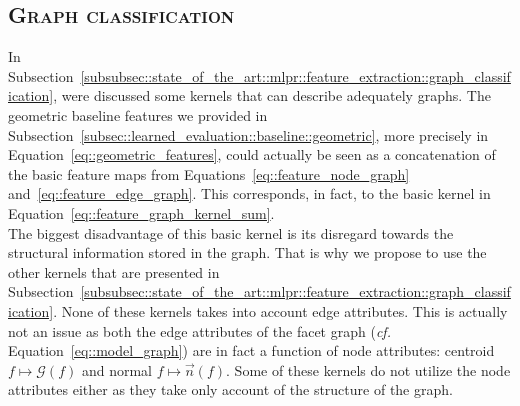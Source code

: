     \subsection{\textsc{Graph classification}}
        \label{subsec::learned_evaluation::richer_features::graph}
        In Subsection~\ref{subsubsec::state_of_the_art::mlpr::feature_extraction::graph_classification}, were discussed some kernels that can describe adequately graphs.
        The geometric baseline features we provided in Subsection~\ref{subsec::learned_evaluation::baseline::geometric}, more precisely in Equation~\ref{eq::geometric_features}, could actually be seen as a concatenation of the basic feature maps from Equations~\ref{eq::feature_node_graph} and~\ref{eq::feature_edge_graph}.
        This corresponds, in fact, to the basic kernel in Equation~\ref{eq::feature_graph_kernel_sum}.\\

        The biggest disadvantage of this basic kernel is its disregard towards the structural information stored in the graph.
        That is why we propose to use the other kernels that are presented in Subsection~\ref{subsubsec::state_of_the_art::mlpr::feature_extraction::graph_classification}.
        None of these kernels takes into account edge attributes.
        This is actually not an issue as both the edge attributes of the facet graph (\textit{cf.} Equation~\ref{eq::model_graph}) are in fact a function of node attributes: centroid \(f \mapsto \mathscr{G}\left(f\right)\) and normal \(f \mapsto \vec{n}\left(f\right)\).
        Some of these kernels do not utilize the node attributes either as they take only account of the structure of the graph.\\

